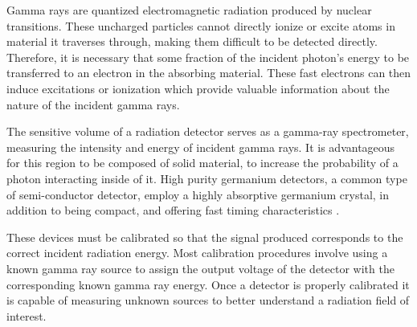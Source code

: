 
Gamma rays are quantized electromagnetic radiation produced
by nuclear transitions. These uncharged particles cannot directly ionize or
excite atoms in material it traverses through, making them difficult to be
detected directly. Therefore, it is necessary that some fraction of the incident
photon's energy to be transferred to an electron in the absorbing
material. These fast electrons can then induce excitations or ionization which
 provide valuable information about the nature of the incident gamma rays.

The sensitive volume of a radiation detector serves as a
gamma-ray spectrometer, measuring the intensity and energy of incident gamma rays.
It is advantageous for this region to be composed of solid material, to increase
the probability of a photon interacting inside of it. High purity germanium detectors,
a common type of semi-conductor detector, employ a highly absorptive germanium crystal,
 in addition to being compact, and offering
fast timing characteristics \cite{knoll}.

These devices must be calibrated so that the signal produced
corresponds to the correct incident radiation energy. Most calibration
procedures involve using a known gamma ray source to assign the output
voltage of the detector with the corresponding known gamma ray energy. Once
a detector is properly calibrated it is capable of measuring unknown sources
to better understand a radiation field of interest.
